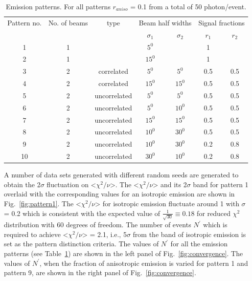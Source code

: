 \begin{table}[h]
  \centering
  \caption{Emission patterns. For all patterns $r_{aniso}$ = 0.1 from a 
  total of 50 photon/event.}
  \label{tab:AnisoPattern}
  \begin{tabular}{|c |c |c|cc|cc|}
  \hline
  Pattern no. & No. of beams & type & \multicolumn{2}{c|}{Beam half widths}& \multicolumn{2}{c|}{Signal fractions} \\
  &              &      &  $\sigma_1$ & $\sigma_2$   &  $r_1$ & $r_2$    \\
  \hline
  1 & 1 & & $5^{0}$ & & 1 & \\
   2 & 1 & & $15^{0}$ & & 1 & \\
   3 & 2 & correlated & $5^{0}$ & $5^{0}$ & 0.5 & 0.5  \\
   4 & 2 & correlated & $15^{0}$ & $15^{0}$ & 0.5 & 0.5 \\
   5 & 2 & uncorrelated & $5^{0}$ & $5^{0}$ & 0.5 & 0.5 \\
   6 & 2 & uncorrelated & $5^{0}$ & $10^{0}$ & 0.5 & 0.5 \\
   7 & 2 & uncorrelated & $15^{0}$ & $15^{0}$ & 0.5 & 0.5 \\
   8 & 2 & uncorrelated & $10^{0}$ & $30^{0}$ & 0.5 & 0.5 \\
   9 & 2 & uncorrelated & $10^{0}$ & $30^{0}$ & 0.2 & 0.8 \\
    10 & 2 & uncorrelated & $30^{0}$ & $10^{0}$ & 0.2 & 0.8 \\
  \hline
 \end{tabular}
\end{table}

A number of data sets generated with different random seeds are 
generated to obtain the 2$\sigma$ fluctuation on <$\chi^2/\nu$>. The <$\chi^2/\nu$> 
and its 2$\sigma$ band for pattern 1 overlaid with the corresponding values 
for an isotropic emission are shown in Fig.~\ref{fig:pattern1}. The <$\chi^2/\nu$> for 
isotropic emission fluctuate around 1 with $\sigma$ = 0.2 which is consistent with 
the expected value of $\frac{1}{\sqrt{30}} \equiv 0.18$ for reduced $\chi^2$ distribution 
with 60 degrees of freedom. The number of events 
$N^{'}$ which is required to achieve <$\chi^2/\nu$> = 2.1, i.e., 5$\sigma$ from the 
band of isotropic emission is set as the pattern distinction criteria. The values of 
$N^{'}$ for all the emission patterns (see Table~\ref{tab:AnisoPattern}) are shown 
in the left panel of Fig.~\ref{fig:convergence}. The values of $N^{'}$, when the fraction of anisotropic 
emission is varied for pattern 1 and pattern 9, are shown in the right panel of Fig.~\ref{fig:convergence}. 

